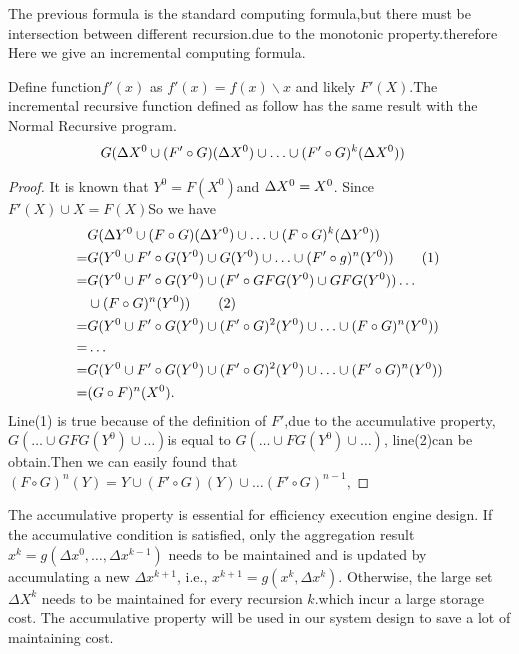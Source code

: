 {\color{red} The previous formula is the standard computing formula,but there must be intersection between different recursion.due to the monotonic property.therefore Here we give an incremental computing formula.
	\begin{theorem}
		Define function$f'(x)$ as $f'(x)=f(x)\backslash x$ and likely $F'(X)$.The incremental recursive function defined as follow has the same result with the Normal Recursive program. 
	 \begin{align}
	 	&G(\Delta X^0\cup (F'\circ G)(\Delta X^0)\cup\ldots\cup (F'\circ G)^k(\Delta X^0))\notag 
	 \end{align}
	\end{theorem}
 \begin{proof}
 	It is known that $Y^0=F(X^0)$and $\Delta X^0=X^0\\$. Since $F'(X)\cup X=F(X)$So we have
 	\begin{align}
 	&G(\Delta Y^0\cup (F\circ G)(\Delta Y^0)\cup\ldots\cup (F\circ G)^k(\Delta Y^0))\notag \\
 	=&G(Y^0\cup F'\circ G(Y^0)\cup G(Y^0)\cup \ldots \cup (F'\circ g)^n(Y^0))    \tag{1}\\
 	=&G(Y^0\cup F'\circ G(Y^0)\cup(F'\circ GFG(Y^0) \cup GFG(Y^0)) \ldots \notag \\ &\cup (F\circ G)^n(Y^0)) \tag{2}\\
 	=&G(Y^0\cup F'\circ G(Y^0)\cup (F'\circ G)^2(Y^0)\cup \ldots \cup (F\circ G)^n(Y^0))\notag\\
 	=& \ldots \notag \\
 	=&G(Y^0\cup F'\circ G(Y^0)\cup (F'\circ G)^2(Y^0)\cup \ldots \cup (F'\circ G)^n(Y^0))\notag\\
 	=&(G \circ F)^n(X^0).\notag
 	\end{align}
 	Line(1) is true because of the definition of $F'$,due to the accumulative property, $G(\ldots \cup GFG(Y^0)\cup \ldots)$is equal to $G(\ldots \cup FG(Y^0)\cup \ldots)$, line(2)can be obtain.Then we can easily found that $(F \circ G)^n(Y)=Y \cup (F'\circ G)(Y)\cup \ldots(F' \circ G)^{n-1}$,
 \end{proof}
}
 The accumulative property is essential for efficiency execution engine design. If the accumulative condition is satisfied, only the aggregation result $x^k=g(\Delta x^{0},\ldots,\Delta x^{k-1})$ needs to be maintained and is updated by accumulating a new $\Delta x^{k+1}$, i.e., $x^{k+1}=g(x^k,\Delta x^{k})$. Otherwise, the large set $\Delta X^{k}$ needs to be maintained for every recursion $k$.which incur a large storage cost. The accumulative property will be used in our system design to save a lot of maintaining cost.

